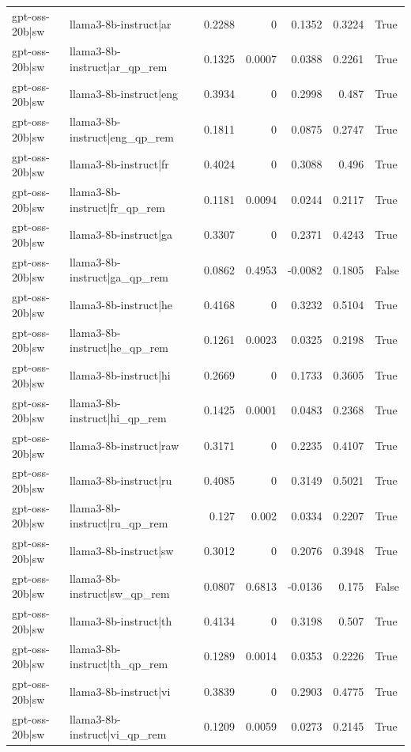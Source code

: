 \begin{table}
\begin{tabular}{l l r r r r l}
gpt-oss-20b|sw & llama3-8b-instruct|ar & 0.2288 & 0 & 0.1352 & 0.3224 & True \\
gpt-oss-20b|sw & llama3-8b-instruct|ar_qp_rem & 0.1325 & 0.0007 & 0.0388 & 0.2261 & True \\
gpt-oss-20b|sw & llama3-8b-instruct|eng & 0.3934 & 0 & 0.2998 & 0.487 & True \\
gpt-oss-20b|sw & llama3-8b-instruct|eng_qp_rem & 0.1811 & 0 & 0.0875 & 0.2747 & True \\
gpt-oss-20b|sw & llama3-8b-instruct|fr & 0.4024 & 0 & 0.3088 & 0.496 & True \\
gpt-oss-20b|sw & llama3-8b-instruct|fr_qp_rem & 0.1181 & 0.0094 & 0.0244 & 0.2117 & True \\
gpt-oss-20b|sw & llama3-8b-instruct|ga & 0.3307 & 0 & 0.2371 & 0.4243 & True \\
gpt-oss-20b|sw & llama3-8b-instruct|ga_qp_rem & 0.0862 & 0.4953 & -0.0082 & 0.1805 & False \\
gpt-oss-20b|sw & llama3-8b-instruct|he & 0.4168 & 0 & 0.3232 & 0.5104 & True \\
gpt-oss-20b|sw & llama3-8b-instruct|he_qp_rem & 0.1261 & 0.0023 & 0.0325 & 0.2198 & True \\
gpt-oss-20b|sw & llama3-8b-instruct|hi & 0.2669 & 0 & 0.1733 & 0.3605 & True \\
gpt-oss-20b|sw & llama3-8b-instruct|hi_qp_rem & 0.1425 & 0.0001 & 0.0483 & 0.2368 & True \\
gpt-oss-20b|sw & llama3-8b-instruct|raw & 0.3171 & 0 & 0.2235 & 0.4107 & True \\
gpt-oss-20b|sw & llama3-8b-instruct|ru & 0.4085 & 0 & 0.3149 & 0.5021 & True \\
gpt-oss-20b|sw & llama3-8b-instruct|ru_qp_rem & 0.127 & 0.002 & 0.0334 & 0.2207 & True \\
gpt-oss-20b|sw & llama3-8b-instruct|sw & 0.3012 & 0 & 0.2076 & 0.3948 & True \\
gpt-oss-20b|sw & llama3-8b-instruct|sw_qp_rem & 0.0807 & 0.6813 & -0.0136 & 0.175 & False \\
gpt-oss-20b|sw & llama3-8b-instruct|th & 0.4134 & 0 & 0.3198 & 0.507 & True \\
gpt-oss-20b|sw & llama3-8b-instruct|th_qp_rem & 0.1289 & 0.0014 & 0.0353 & 0.2226 & True \\
gpt-oss-20b|sw & llama3-8b-instruct|vi & 0.3839 & 0 & 0.2903 & 0.4775 & True \\
gpt-oss-20b|sw & llama3-8b-instruct|vi_qp_rem & 0.1209 & 0.0059 & 0.0273 & 0.2145 & True \\

\end{tabular}
\end{table}
